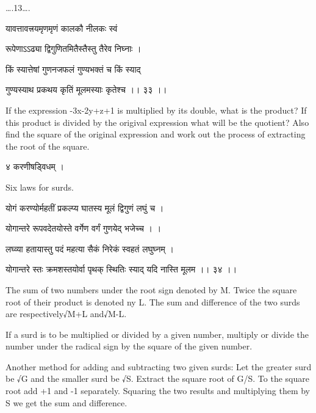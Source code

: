 \documentclass[]{article}
\date{}
\begin{document}
{\ldots{}.13\ldots{}.}

{यावत्तावत्त्रयमृणमृणं कालकौ नीलकः स्वं }

{रूपेणाऽऽढ्या द्विगुणितमितैस्तैस्तु तैरेव निघ्नाः । }

{किं स्यात्तेषां गुणनजफलं गुण्यभक्तं च किं स्याद् }

{गुण्यस्याथ प्रकथय कृतिं मूलमस्याः कृतेश्च ।। ३३ ।। }

{If the expression -3x-2y+z+1 is multiplied by its double, what is the
product? If this product is divided by the origival expression what will
be the quotient? Also find the square of the original expression and
work out the process of extracting the root of the square.}

{ }

{४ करणीषड्विधम् । }

{Six laws for surds.}

{योगं करण्योर्महतीं प्रकल्प्य घातस्य मूलं द्विगुणं लघुं च । }

{योगान्तरे रूपवदेतयोस्ते वर्गेण वर्गं गुणयेद् भजेच्च । । }

{लघ्व्या हतायास्तु पदं महत्या सैकं निरेकं स्वहतं लघुघ्नम् । }

{योगान्तरे स्तः क्रमशस्तयोर्वा पृथक् स्थितिः स्याद् यदि नास्ति मूलम ।।
३४ ।। }

{The sum of two numbers under the root sign denoted by M. Twice the
square root of their product is denoted ny L. The sum and difference of
the two surds are respectively}{√}{M+L }{and}{√}{M-L.}

{If a surd is to be multiplied or divided by a given number, multiply or
divide the number under the radical sign by the square of the given
number.}

{Another method for adding and subtracting two given surds: Let the
greater surd be }{√}{G and the smaller surd be }{√}{S. Extract the
square root of G/S. To the square root add +1 and -1 separately.
Squaring the two results and multiplying them by S we get the sum and
difference.\\
}
\end{document}
